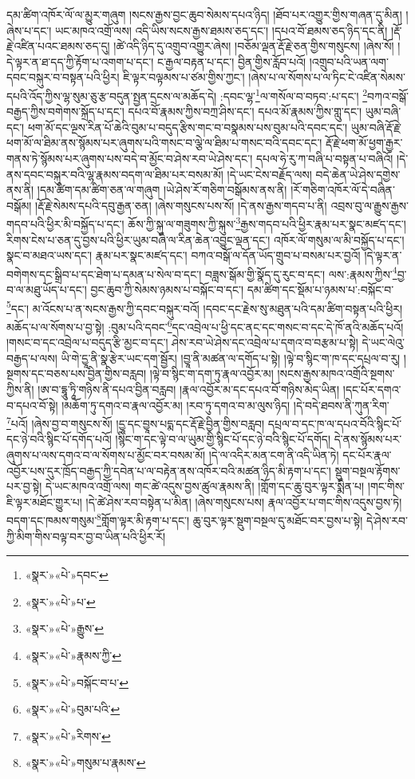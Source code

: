 དམ་ཚིག་འཁོར་ལོ་ལ་མྱུར་གཞུག །སངས་རྒྱས་བྱང་ཆུབ་སེམས་དཔའ་ཉིད། །ཐོབ་པར་འགྱུར་གྱིས་གཞན་དུ་མིན། །ཞེས་པ་དང་། ཡང་མཁའ་འགྲོ་ལས། འདི་ཡིས་སངས་རྒྱས་ཐམས་ཅད་དང་། །དཔའ་བོ་ཐམས་ཅད་ཉིད་དང་ནི། །རྡོ་རྗེ་འཛིན་པའང་ཐམས་ཅད་དུ། །ཚེ་འདི་ཉིད་དུ་འགྲུབ་འགྱུར་ཞེས། །བཅོམ་ལྡན་རྡོ་རྗེ་ཅན་གྱིས་གསུངས། །ཞེས་སོ། །དེ་ལྟར་ན་ཐ་དད་ཀྱི་རྟོག་པ་འགག་པ་དང་། ང་རྒྱལ་བརྟན་པ་དང་། བྱིན་གྱིས་རློབ་པའོ། །འགྲུབ་པའི་ཡན་ལག་དབང་བསྐུར་བ་བསྟན་པའི་ཕྱིར། ཇི་ལྟར་བལྟམས་པ་ཙམ་གྱིས་ཀྱང་། །ཞེས་པ་ལ་སོགས་པ་ལ་ཏིང་ངེ་འཛིན་སེམས་དཔའི་འོད་ཀྱིས་ལྷ་སུམ་ཅུ་རྩ་བདུན་སྤྱན་དྲངས་ལ་མཆོད་དེ། :དབང་ལྷ་\footnote{«སྣར་»«པེ་»དབང་}ལ་གསོལ་བ་བཏབ་:པ་དང་། \footnote{«སྣར་»«པེ་»པ་}བཀའ་བསྒོ་བརྒྱད་ཀྱིས་བགེགས་སྐྲོད་པ་དང་། དཔའ་བོ་རྣམས་ཀྱིས་བཀྲ་ཤིས་དང་། དཔའ་མོ་རྣམས་ཀྱིས་གླུ་དང་། ཡུམ་བཞི་དང་། ཕག་མོ་དང་ལྔས་རིན་པོ་ཆེའི་བུམ་པ་བདུད་རྩིས་གང་བ་བསྣམས་པས་བུམ་པའི་དབང་དང་། ཡུམ་བཞི་རྡོ་རྗེ་ཕག་མོ་ལ་ཐིམ་ནས་སྙོམས་པར་ཞུགས་པའི་གསང་བ་ལྕེ་ལ་ཐིམ་པ་གསང་བའི་དབང་དང་། རྡོ་རྗེ་ཕག་མོ་ཕྱག་རྒྱར་གནས་ཏེ་སྙོམས་པར་ཞུགས་པས་བདེ་བ་མྱོང་བ་ཤེས་རབ་ཡེ་ཤེས་དང་། དཔལ་ཧེ་རུ་ཀ་བཞི་པ་བསྟན་པ་བཞིའོ། །དེ་ནས་དབང་བསྐུར་བའི་ལྷ་རྣམས་བདག་ལ་ཐིམ་པར་བསམ་མོ། །དེ་ཡང་ངེས་བརྗོད་ལས། བདེ་ཆེན་ཡེ་ཤེས་དགྱེས་ནས་ནི། །དམ་ཚིག་དམ་ཚིག་ཅན་ལ་གཞུག །ཡེ་ཤེས་རོ་གཅིག་བསྒོམས་ནས་ནི། །རོ་གཅིག་འཁོར་ལོ་དེ་བཞིན་བསྒོམ། །རྡོ་རྗེ་སེམས་དཔའི་དབུ་རྒྱན་ཅན། །ཞེས་གསུངས་པས་སོ། །དེ་ནས་རྒྱས་གདབ་པ་ནི། འབྲས་བུ་ལ་རྒྱུས་རྒྱས་གདབ་པའི་ཕྱིར་མི་བསྐྱོད་པ་དང་། ཆོས་ཀྱི་སྐུ་ལ་གཟུགས་ཀྱི་སྐུས་\footnote{«སྣར་»«པེ་»རྒྱུས་}རྒྱས་གདབ་པའི་ཕྱིར་རྣམ་པར་སྣང་མཛད་དང་། རིགས་ངེས་པ་ཅན་དུ་བྱས་པའི་ཕྱིར་ཡུམ་བཞི་ལ་རིན་ཆེན་འབྱུང་ལྡན་དང་། འཁོར་ལོ་གསུམ་ལ་མི་བསྐྱོད་པ་དང་། སྣང་བ་མཐའ་ཡས་དང་། རྣམ་པར་སྣང་མཛད་དང་། བཀའ་བསྒོ་ལ་དོན་ཡོད་གྲུབ་པ་བསམ་པར་བྱའོ། །དེ་ལྟར་ན་བགེགས་དང་སྒྲིབ་པ་དང་ཐེག་པ་དམན་པ་སེལ་བ་དང་། བཟླས་སྒོམ་གྱི་སྣོད་དུ་རུང་བ་དང་། ལས་:རྣམས་ཀྱིས་\footnote{«སྣར་»«པེ་»རྣམས་ཀྱི་}བྱ་བ་ལ་མཐུ་ཡོད་པ་དང་། བྱང་ཆུབ་ཀྱི་སེམས་ཉམས་པ་བསྐོང་བ་དང་། དམ་ཚིག་དང་སྡོམ་པ་ཉམས་པ་:བསྐོང་བ་\footnote{«སྣར་»«པེ་»བསྐོང་བ་པ་}དང་། མ་འོངས་པ་ན་སངས་རྒྱས་ཀྱི་དབང་བསྐུར་བའོ། །དབང་དང་རྗེས་སུ་མཐུན་པའི་དམ་ཚིག་བསྟན་པའི་ཕྱིར། མཆོད་པ་ལ་སོགས་པ་བྱ་སྟེ། :བུམ་པའི་དབང་\footnote{«སྣར་»«པེ་»བུམ་པའི་}དང་འབྲེལ་པ་ཕྱི་དང་ནང་དང་གསང་བ་དང་དེ་ཁོ་ནའི་མཆོད་པའོ། །གསང་བ་དང་འབྲེལ་པ་བདུད་རྩི་མྱང་བ་དང་། ཤེས་རབ་ཡེ་ཤེས་དང་འབྲེལ་པ་དགའ་བ་བརྩམ་པ་སྟེ། དེ་ཡང་ལེའུ་བརྒྱད་པ་ལས། ཡི་གེ་དྱཱ་ནི་སྣ་རྩེར་ཡང་དག་སྦྱོར། །བྱཱ་ནི་མཚན་ལ་དགོད་པ་སྟེ། །ལྟེ་བ་སྙིང་ག་ཁ་དང་དཔྲལ་བ་རུ། །སྔགས་དང་བཅས་པས་བྱིན་གྱིས་བརླབ། །ལྟེ་བ་སྙིང་ག་དག་ཏུ་རྣལ་འབྱོར་མ། །སངས་རྒྱས་མཁའ་འགྲོའི་སྔགས་ཀྱིས་ནི། །ཨ་བ་དྷཱུ་ཏཱི་གཉིས་ནི་དཔའ་བྱིན་བརླབ། །རྣལ་འབྱོར་མ་དང་དཔའ་བོ་གཉིས་མེད་ཡིན། །དང་པོར་དགའ་བ་དཔའ་བོ་སྟེ། །མཆོག་ཏུ་དགའ་བ་རྣལ་འབྱོར་མ། །རབ་ཏུ་དགའ་བ་མ་ལུས་ཉིད། །དེ་བདེ་ཐབས་ནི་ཀུན་རིག་\footnote{«སྣར་»«པེ་»རིགས་}པའོ། །ཞེས་བྱ་བ་གསུངས་སོ། །དྱཱ་དང་བྱཱས་པདྨ་དང་རྡོ་རྗེ་བྱིན་གྱིས་བརླབ། དཔྲལ་བ་དང་ཁ་ལ་དཔའ་བོའི་སྙིང་པོ་དང་ཉེ་བའི་སྙིང་པོ་དགོད་པའོ། །སྙིང་ག་དང་ལྟེ་བ་ལ་ཡུམ་གྱི་སྙིང་པོ་དང་ཉེ་བའི་སྙིང་པོ་དགོད། དེ་ནས་སྙོམས་པར་ཞུགས་པ་ལས་དགའ་བ་ལ་སོགས་པ་མྱོང་བར་བསམ་མོ། །དེ་ལ་འདིར་མན་ངག་ནི་འདི་ཡིན་ཏེ། དང་པོར་རྣལ་འབྱོར་པས་དུར་ཁྲོད་བརྒྱད་ཀྱི་དབེན་པ་ལ་བརྟེན་ནས་འཁོར་བའི་མཚན་ཉིད་མི་རྟག་པ་དང་། སྡུག་བསྔལ་རྟོགས་པར་བྱ་སྟེ། དེ་ཡང་མཁའ་འགྲོ་ལས། གང་ཚེ་འདུས་བྱས་ཚུལ་རྣམས་ནི། །གློག་དང་ཆུ་བུར་ལྟར་སྨིན་པ། །གང་གིས་ཇི་ལྟར་མཐོང་གྱུར་པ། །དེ་ཚེ་ཤེས་རབ་བསྟེན་པ་མིན། །ཞེས་གསུངས་པས། རྣལ་འབྱོར་པ་གང་གིས་འདུས་བྱས་ཏེ། བདག་དང་ཁམས་གསུམ་\footnote{«སྣར་»«པེ་»གསུམ་པ་རྣམས་}གློག་ལྟར་མི་རྟག་པ་དང་། ཆུ་བུར་ལྟར་སྡུག་བསྔལ་དུ་མཐོང་བར་བྱས་པ་སྟེ། དེ་ཤེས་རབ་ཀྱི་མིག་གིས་བལྟ་བར་བྱ་བ་ཡིན་པའི་ཕྱིར་རོ། 